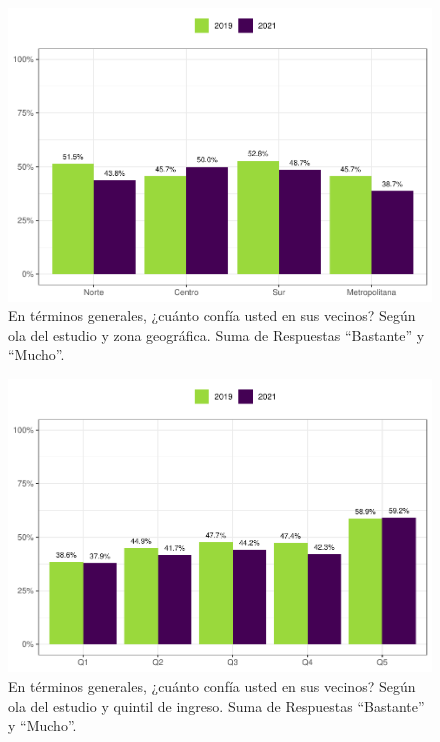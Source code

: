 \documentclass[
  12pt,
  openany]{book}
\begin{document}
\begin{figure}

{\centering \includegraphics{reporte-elsoc_files/figure-latex/vecinos-zona-1} 

}

\caption{En términos generales, ¿cuánto confía usted en sus vecinos? Según ola del estudio y zona geográfica. Suma de Respuestas “Bastante” y “Mucho”.}\label{fig:vecinos-zona}
\end{figure}

\begin{figure}

{\centering \includegraphics{reporte-elsoc_files/figure-latex/vecinos-quintil-1} 

}

\caption{En términos generales, ¿cuánto confía usted en sus vecinos? Según ola del estudio y quintil de ingreso. Suma de Respuestas “Bastante” y “Mucho”.}\label{fig:vecinos-quintil}
\end{figure}
\end{document}
